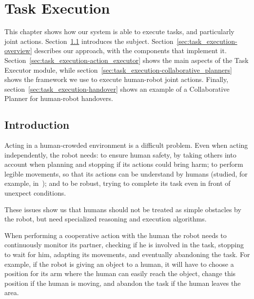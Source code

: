 
\chapter{Task Execution} %

\label{chapter:task_execution} %


This chapter shows how our system is able to execute tasks, and particularly joint actions. Section~\ref{sec:task_execution-intro} introduces the subject. Section~\ref{sec:task_execution-overview} describes our approach, with the components that implement it. Section~\ref{sec:task_execution-action_executor} shows the main aspects of the Task Executor module, while section~\ref{sec:task_execution-collaborative_planners} shows the framework we use to execute human-robot joint actions. Finally, section~\ref{sec:task_execution-handover} shows an example of a Collaborative Planner for human-robot handovers.


\section{Introduction}
\label{sec:task_execution-intro}
Acting in a human-crowded environment is a difficult problem. Even when acting independently, the robot needs: to ensure human safety, by taking others into account when planning and stopping if its actions could bring harm; to perform legible movements, so that its actions can be understand by humans (studied, for example, in~\cite{dragan2013legibility}); and to be robust, trying to complete its task even in front of unexpect conditions. 

These issues show us that humans should not be treated as simple obstacles by the robot, but need specialized reasoning and execution algorithms.

When performing a cooperative action with the human the robot needs to continuously monitor its partner, checking if he is involved in the task, stopping to wait for him, adapting its movements, and eventually abandoning the task. For example, if the robot is giving an object to a human, it will have to choose a position for its arm where the human can easily reach the object, change this position if the human is moving, and abandon the task if the human leaves the area.

